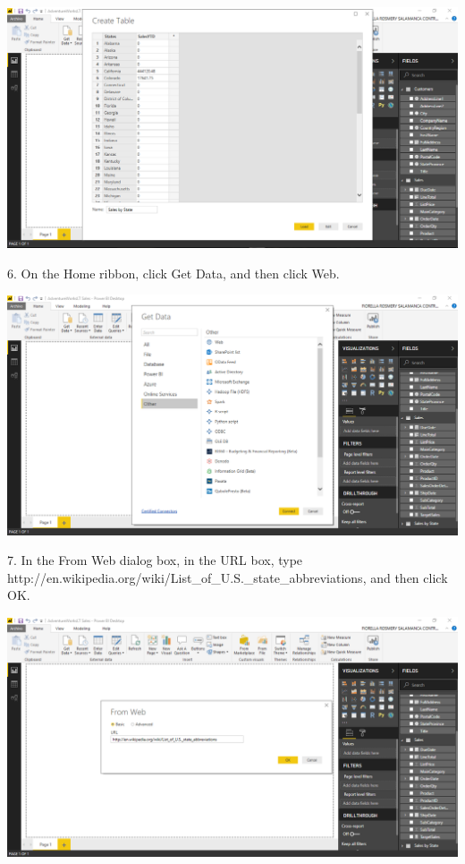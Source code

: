 	\begin{center}
	\includegraphics[width=17cm]{./Imagenes/Ejercicio1/Tarea4/3}
	\end{center}	

6. On the Home ribbon, click Get Data, and then click Web.\\

	\begin{center}
	\includegraphics[width=17cm]{./Imagenes/Ejercicio1/Tarea4/4}
	\end{center}	


7. In the From Web dialog box, in the URL box, type http://en.wikipedia.org/wiki/List\_of\_U.S.\_state\_abbreviations, and then click OK.\\

	\begin{center}
	\includegraphics[width=17cm]{./Imagenes/Ejercicio1/Tarea4/5}
	\end{center}	

